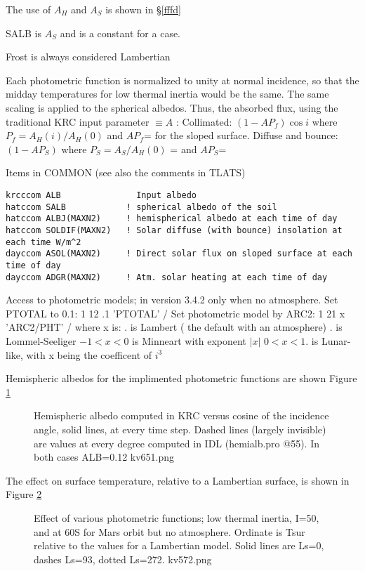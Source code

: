 The use of $A_H$ and $A_S$ is shown in \S \ref{fffd}

SALB is $A_S$ and is a constant for a case.

Frost is always considered Lambertian

Each photometric function is normalized to unity at normal incidence, so that
the midday temperatures for low thermal inertia would be the same. The same
scaling is applied to the spherical albedos. Thus, the absorbed flux, using the
traditional KRC input parameter $\equiv A$ :
\qi Collimated: $(1-A P_f) \cos i$ where $P_f = A_H(i)/A_H(0)$ and 
$A P_f$= for the sloped surface.
\qi Diffuse and bounce: $(1-A P_S)$ where $P_S = A_S/A_H(0)$ =  and 
$A P_S$=

Items in COMMON (see also the comments in TLATS)
\vspace{-3.mm} 
\begin{verbatim}
krcccom ALB               Input albedo
hatccom SALB            ! spherical albedo of the soil
hatccom ALBJ(MAXN2)     ! hemispherical albedo at each time of day
hatccom SOLDIF(MAXN2)   ! Solar diffuse (with bounce) insolation at each time W/m^2 
dayccom ASOL(MAXN2)     ! Direct solar flux on sloped surface at each time of day
dayccom ADGR(MAXN2)     ! Atm. solar heating at each time of day 
\end{verbatim} 

Access to photometric models; in version 3.4.2 only when no atmosphere.
\qi Set PTOTAL to 0.1:  1 12 .1 'PTOTAL'   /
\qi Set photometric model by ARC2:  1 21 x 'ARC2/PHT' /  where x is: 
. is Lambert ( the default with an atmosphere)
. is Lommel-Seeliger
\qii $-1<x<0$ is Minneart with exponent  $|x|$
\qii   $0<x<1.$ is Lunar-like, with x being the coefficent of $i^3$

Hemispheric albedos for the implimented photometric functions are shown Figure \ref{kv651}  
\begin{figure}[!ht] 
\caption[Test of Photometric functions]{Hemispheric albedo computed in KRC
  versus cosine of the incidence angle, solid lines, at every time step. Dashed
  lines (largely invisible) are values at every degree computed in IDL
  (hemialb.pro @55). In both cases ALB=0.12
\label{kv651}  kv651.png }
\end{figure} 

 The effect on surface temperature, relative to a Lambertian surface, is shown in 
Figure \ref{kv572}  
\begin{figure}[!ht] 
\caption[Effect of Photometric functions]{Effect of various photometric
  functions; low thermal inertia, I=50, and at 60\qd S for Mars orbit but no
  atmosphere. Ordinate is Tsur relative to the values for a Lambertian
  model. Solid lines are Ls=0, dashes Ls=93, dotted Ls=272.
\label{kv572}  kv572.png }
\end{figure} 

